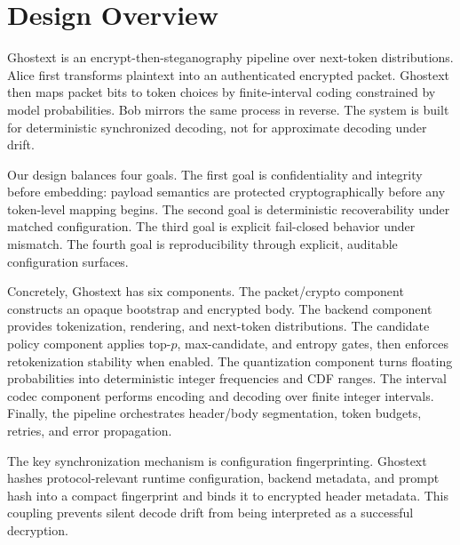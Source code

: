 \section{Design Overview}
Ghostext is an encrypt-then-steganography pipeline over next-token distributions. Alice first transforms plaintext into an authenticated encrypted packet. Ghostext then maps packet bits to token choices by finite-interval coding constrained by model probabilities. Bob mirrors the same process in reverse. The system is built for deterministic synchronized decoding, not for approximate decoding under drift.

Our design balances four goals. The first goal is confidentiality and integrity before embedding: payload semantics are protected cryptographically before any token-level mapping begins. The second goal is deterministic recoverability under matched configuration. The third goal is explicit fail-closed behavior under mismatch. The fourth goal is reproducibility through explicit, auditable configuration surfaces.

Concretely, Ghostext has six components. The packet/crypto component constructs an opaque bootstrap and encrypted body. The backend component provides tokenization, rendering, and next-token distributions. The candidate policy component applies top-$p$, max-candidate, and entropy gates, then enforces retokenization stability when enabled. The quantization component turns floating probabilities into deterministic integer frequencies and CDF ranges. The interval codec component performs encoding and decoding over finite integer intervals. Finally, the pipeline orchestrates header/body segmentation, token budgets, retries, and error propagation.

The key synchronization mechanism is configuration fingerprinting. Ghostext hashes protocol-relevant runtime configuration, backend metadata, and prompt hash into a compact fingerprint and binds it to encrypted header metadata. This coupling prevents silent decode drift from being interpreted as a successful decryption.
